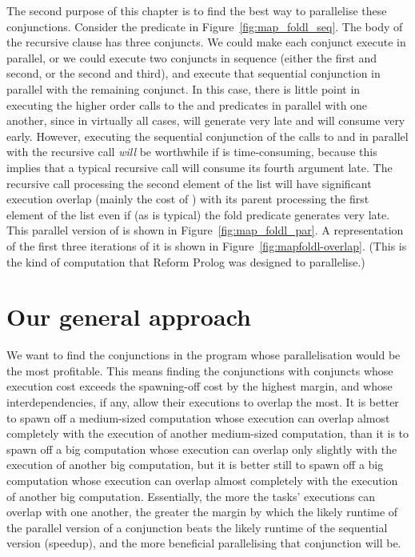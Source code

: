 The second purpose of this chapter is to find the best way to parallelise
these conjunctions.
Consider the \mapfoldl predicate in Figure~\ref{fig:map_foldl_seq}.
The body of the recursive clause has three conjuncts.
We could make each conjunct execute in parallel,
or we could execute two conjuncts in sequence
(either the first and second, or the second and third),
and execute that sequential conjunction in parallel with the remaining conjunct.
In this case, there is little point in executing
the higher order calls to the \M and \F predicates
in parallel with one another,
since in virtually all cases,
\M will generate  very late and
\F will consume  very early.
However, executing the sequential conjunction of the calls to \M and \F
in parallel with the recursive call \emph{will} be worthwhile
if \M is time-consuming,
because this implies that
a typical recursive call will consume its fourth argument late.
The recursive call processing the second element of the list
will have significant execution overlap (mainly the cost of \M)
with its parent processing the first element of the list
even if (as is typical) the fold predicate generates  very late.
This parallel version of \mapfoldl is shown in
Figure~\ref{fig:map_foldl_par}.
A representation of the first three iterations of it
is shown in Figure~\ref{fig:mapfoldl-overlap}.
(This is the kind of computation that
Reform Prolog \citep{bevemyr:reform} was designed to parallelise.)

\section{Our general approach}
\label{sec:overlap_approach}


We want to find the conjunctions in the program
whose parallelisation would be the most profitable.
This means finding the conjunctions with conjuncts
whose execution cost exceeds the spawning-off cost by the highest margin,
and whose interdependencies, if any,
allow their executions to overlap the most.
It is better to spawn off a medium-sized computation
whose execution can overlap almost completely
with the execution of another medium-sized computation,
than it is to spawn off a big computation
whose execution can overlap only slightly
with the execution of another big computation,
but it is better still to spawn off a big computation
whose execution can overlap almost completely
with the execution of another big computation.
Essentially, the more the tasks' executions can overlap with one another,
the greater the margin by which
the likely runtime of the parallel version of a conjunction beats
the likely runtime of the sequential version (speedup),
and the more beneficial parallelising that conjunction will be.

